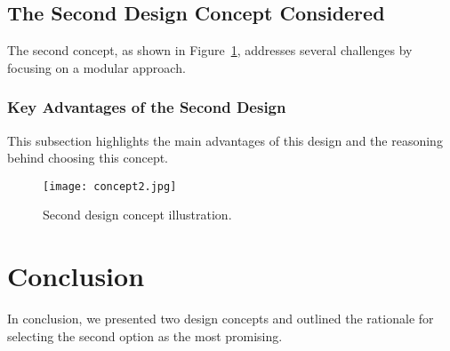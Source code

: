 \documentclass[12pt]{article}
\begin{document}
\subsection{The Second Design Concept Considered}
The second concept, as shown in Figure~\ref{fig:concept2}, addresses several challenges by focusing on a modular approach.

\subsubsection{Key Advantages of the Second Design}
This subsection highlights the main advantages of this design and the reasoning behind choosing this concept.

\begin{figure}[h!]
    \centering
    \texttt{[image: concept2.jpg]}
    \caption{Second design concept illustration.}
    \label{fig:concept2}
\end{figure}

\section{Conclusion}
In conclusion, we presented two design concepts and outlined the rationale for selecting the second option as the most promising.
\end{document}
